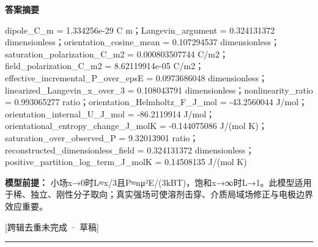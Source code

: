 \documentclass[UTF8,11pt,a4paper]{ctexart}
\begin{document}
\noindent\textbf{答案摘要}\par
dipole\_C\_m = 1.334256e-29 C m；Langevin\_argument = 0.324131372 dimensionless；orientation\_cosine\_mean = 0.107294537 dimensionless；saturation\_polarization\_C\_m2 = 0.000803507744 C/m2；field\_polarization\_C\_m2 = 8.62119914e-05 C/m2；effective\_incremental\_P\_over\_epsE = 0.0973686048 dimensionless；linearized\_Langevin\_x\_over\_3 = 0.108043791 dimensionless；nonlinearity\_ratio = 0.993065277 ratio；orientation\_Helmholtz\_F\_J\_mol = -43.2560044 J/mol；orientation\_internal\_U\_J\_mol = -86.2119914 J/mol；orientational\_entropy\_change\_J\_molK = -0.144075086 J/(mol K)；saturation\_over\_observed\_P = 9.32013901 ratio；reconstructed\_dimensionless\_field = 0.324131372 dimensionless；positive\_partition\_log\_term\_J\_molK = 0.14508135 J/(mol K)\par
\noindent\textbf{模型前提：}
小场x→0时L≈x/3且P≈nμ²E/(3kBT)，饱和x→∞时L→1。此模型适用于稀、独立、刚性分子取向；真实强场可使溶剂击穿、介质局域场修正与电极边界效应重要。\par
\noindent\textcolor{red!65!black}{[跨辑去重未完成 · 草稿]} \par
\medskip\hrule\medskip
{}
\end{document}
